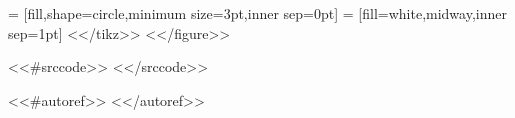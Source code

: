  = [fill,shape=circle,minimum size=3pt,inner sep=0pt]
  = [fill=white,midway,inner sep=1pt]
<</tikz>>
<</figure>>

<<#srccode>>
\lstset{language=Python,style=custompy,captionpos=b}
\renewcommand{\lstlistingname}{<<&lstlistingname>>}
\renewcommand{\lstlistlistingname}{<<&lstlistlistingname>>}
<</srccode>>

<<#autoref>>
\def\partautorefname{<<&part>>}
\def\chapterautorefname{<<&chapter>>}
\def\sectionautorefname{<<&section>>}
\def\subsectionautorefname{<<&subsection>>}
\def\figureautorefname{<<&figure>>}
\def\tableautorefname{<<&table>>}
\def\algorithmautorefname{<<&algorithm>>}
\def\lstinputlistingautorefname{<<&listing>>}
<</autoref>>
